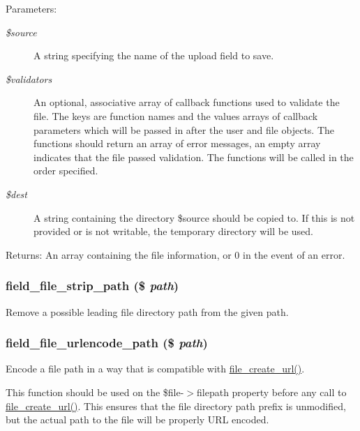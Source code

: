 \begin{Desc}
\item[Parameters:]
\begin{description}
\item[{\em \$source}]A string specifying the name of the upload field to save. \item[{\em \$validators}]An optional, associative array of callback functions used to validate the file. The keys are function names and the values arrays of callback parameters which will be passed in after the user and file objects. The functions should return an array of error messages, an empty array indicates that the file passed validation. The functions will be called in the order specified. \item[{\em \$dest}]A string containing the directory \$source should be copied to. If this is not provided or is not writable, the temporary directory will be used. \end{description}
\end{Desc}
\begin{Desc}
\item[Returns:]An array containing the file information, or 0 in the event of an error. \end{Desc}
\hypertarget{field__file_8inc_1131c2060eba36813763eb04dd6d4843}{
\subsubsection[{field\_\-file\_\-strip\_\-path}]{\setlength{\rightskip}{0pt plus 5cm}field\_\-file\_\-strip\_\-path (\$ {\em path})}}
\label{field__file_8inc_1131c2060eba36813763eb04dd6d4843}


Remove a possible leading file directory path from the given path. \hypertarget{field__file_8inc_f4979515f095d3531c51f752100da7b1}{
\subsubsection[{field\_\-file\_\-urlencode\_\-path}]{\setlength{\rightskip}{0pt plus 5cm}field\_\-file\_\-urlencode\_\-path (\$ {\em path})}}
\label{field__file_8inc_f4979515f095d3531c51f752100da7b1}


Encode a file path in a way that is compatible with \hyperlink{group__file_g1a305a4da1e6e5c6b1783ceffb66c340}{file\_\-create\_\-url()}.

This function should be used on the \$file-$>$filepath property before any call to \hyperlink{group__file_g1a305a4da1e6e5c6b1783ceffb66c340}{file\_\-create\_\-url()}. This ensures that the file directory path prefix is unmodified, but the actual path to the file will be properly URL encoded. 
